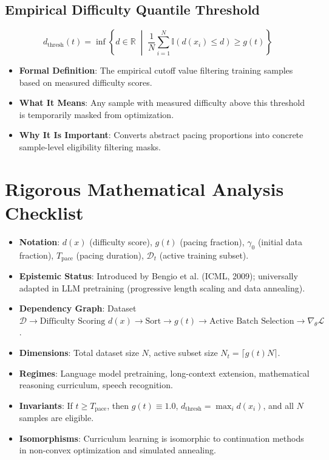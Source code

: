 \documentclass[11pt,a4paper]{article}
\theoremstyle{definition}
\begin{document}
\subsection{Empirical Difficulty Quantile Threshold}
{\boldmath
\begin{equation}
d_{\text{thresh}}(t) = \inf \left\{ d \in \mathbb{R} \;\middle|\; \frac{1}{N}\sum_{i=1}^N \mathbb{I}(d(x_i) \le d) \ge g(t) \right\}
\end{equation}
}
\begin{itemize}
    \item \textbf{Formal Definition}: The empirical cutoff value filtering training samples based on measured difficulty scores.
    \item \textbf{What It Means}: Any sample with measured difficulty above this threshold is temporarily masked from optimization.
    \item \textbf{Why It Is Important}: Converts abstract pacing proportions into concrete sample-level eligibility filtering masks.
\end{itemize}

\section{Rigorous Mathematical Analysis Checklist}

\begin{itemize}
    \item \textbf{Notation}: $d(x)$ (difficulty score), $g(t)$ (pacing fraction), $\gamma_0$ (initial data fraction), $T_{\text{pace}}$ (pacing duration), $\mathcal{D}_t$ (active training subset).
    \item \textbf{Epistemic Status}: Introduced by Bengio et al. (ICML, 2009); universally adapted in LLM pretraining (progressive length scaling and data annealing).
    \item \textbf{Dependency Graph}: Dataset $\mathcal{D} \to \text{Difficulty Scoring } d(x) \to \text{Sort} \to g(t) \to \text{Active Batch Selection} \to \nabla_\theta \mathcal{L}$.
    \item \textbf{Dimensions}: Total dataset size $N$, active subset size $N_t = \lceil g(t) N \rceil$.
    \item \textbf{Regimes}: Language model pretraining, long-context extension, mathematical reasoning curriculum, speech recognition.
    \item \textbf{Invariants}: If $t \ge T_{\text{pace}}$, then $g(t) \equiv 1.0$, $d_{\text{thresh}} = \max_i d(x_i)$, and all $N$ samples are eligible.
    \item \textbf{Isomorphisms}: Curriculum learning is isomorphic to continuation methods in non-convex optimization and simulated annealing.
\end{itemize}
\end{document}
